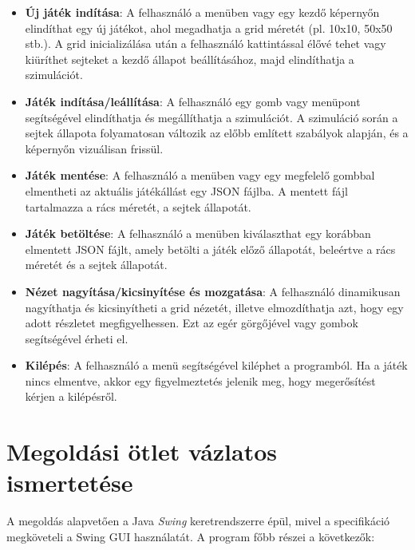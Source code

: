 \documentclass[a4paper,12pt]{article}
\begin{document}
\begin{itemize}
    \item \textbf{Új játék indítása}: A felhasználó a menüben vagy egy kezdő képernyőn elindíthat egy új játékot, ahol megadhatja a grid méretét (pl. 10x10, 50x50 stb.). A grid inicializálása után a felhasználó kattintással élővé tehet vagy kiüríthet sejteket a kezdő állapot beállításához, majd elindíthatja a szimulációt.
    
    \item \textbf{Játék indítása/leállítása}: A felhasználó egy gomb vagy menüpont segítségével elindíthatja és megállíthatja a szimulációt. A szimuláció során a sejtek állapota folyamatosan változik az előbb említett szabályok alapján, és a képernyőn vizuálisan frissül.
    
    \item \textbf{Játék mentése}: A felhasználó a menüben vagy egy megfelelő gombbal elmentheti az aktuális játékállást egy JSON fájlba. A mentett fájl tartalmazza a rács méretét, a sejtek állapotát.
    
    \item \textbf{Játék betöltése}: A felhasználó a menüben kiválaszthat egy korábban elmentett JSON fájlt, amely betölti a játék előző állapotát, beleértve a rács méretét és a sejtek állapotát.
    
    \item \textbf{Nézet nagyítása/kicsinyítése és mozgatása}: A felhasználó dinamikusan nagyíthatja és kicsinyítheti a grid nézetét, illetve elmozdíthatja azt, hogy egy adott részletet megfigyelhessen. Ezt az egér görgőjével vagy gombok segítségével érheti el.
    
    \item \textbf{Kilépés}: A felhasználó a menü segítségével kiléphet a programból. Ha a játék nincs elmentve, akkor egy figyelmeztetés jelenik meg, hogy megerősítést kérjen a kilépésről.
\end{itemize}

\newpage

\section*{Megoldási ötlet vázlatos ismertetése}

A megoldás alapvetően a Java \textit{Swing} keretrendszerre épül, mivel a specifikáció megköveteli a Swing GUI használatát. A program főbb részei a következők:
\end{document}
